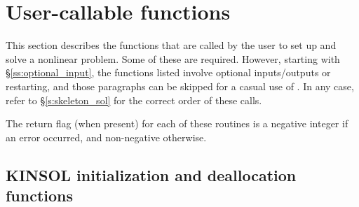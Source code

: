 
\section{User-callable functions}\label{s:kinsol_fct_sol}

This section describes the {\kinsol} functions that are called by the
user to set up and solve a nonlinear problem. Some of these are required. 
However, starting with \S\ref{ss:optional_input}, the functions listed involve
optional inputs/outputs or restarting, and those paragraphs can be
skipped for a casual use of {\kinsol}. In any case, refer to
\S\ref{s:skeleton_sol} for the correct order of these calls.

The return flag (when present) for each of these routines is a
negative integer if an error occurred, and non-negative otherwise.


\subsection{KINSOL initialization and deallocation functions}
\label{sss:kinmalloc}

